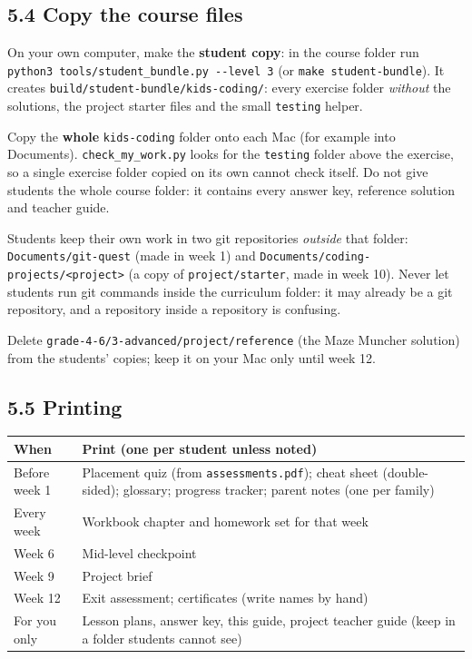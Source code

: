 \documentclass[level=3,teacher]{kidscode}
\begin{document}
\subsection{5.4 Copy the course files}
\begin{checklist}
  \item On your own computer, make the \textbf{student copy}: in the course folder run
        \texttt{python3 tools/student\_bundle.py -{}-level 3} (or \texttt{make student-bundle}). It creates
        \texttt{build/\allowbreak student-bundle/\allowbreak kids-coding/}: every exercise folder \emph{without} the solutions,
        the project starter files and the small \texttt{testing} helper.
  \item Copy the \textbf{whole} \texttt{kids-coding} folder onto each Mac (for example into Documents).
        \texttt{check\_my\_work.py} looks for the \texttt{testing} folder above the exercise, so a single
        exercise folder copied on its own cannot check itself. Do not give students the whole course
        folder: it contains every answer key, reference solution and teacher guide.
  \item Students keep their own work in two git repositories \emph{outside} that folder:
        \texttt{Documents/git-quest} (made in week 1) and
        \texttt{Documents/coding-projects/<project>} (a copy of \texttt{project/starter}, made in
        week 10). Never let students run git commands inside the curriculum folder: it may already
        be a git repository, and a repository inside a repository is confusing.
  \item Delete \texttt{grade-4-6/3-advanced/project/reference} (the Maze Muncher solution) from the
        students' copies; keep it on your Mac only until week 12.
\end{checklist}

\subsection{5.5 Printing}
\begin{tabularx}{\linewidth}{@{}>{\raggedright\arraybackslash}p{4.8cm}X@{}}
\toprule
\rowcolor{kcaccent!15} When & Print (one per student unless noted)\\ \midrule
Before week 1 & Placement quiz (from \texttt{assessments.pdf}); cheat sheet (double-sided); glossary;
progress tracker; parent notes (one per family)\\
Every week & Workbook chapter and homework set for that week\\
Week 6 & Mid-level checkpoint\\
Week 9 & Project brief\\
Week 12 & Exit assessment; certificates (write names by hand)\\
For you only & Lesson plans, answer key, this guide, project teacher guide (keep in a folder
students cannot see)\\
\bottomrule
\end{tabularx}
\end{document}
